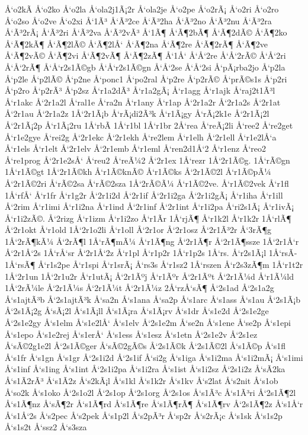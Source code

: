 {Å‘o2kÃ­
Å‘o2ko
Å‘o2la
Å‘ola2j1Ã¡2r
Å‘ola2je
Å‘o2pe
Å‘o2rÃ¡
Å‘o2ri
Å‘o2ro
Å‘o2so
Å‘o2ve
Å‘o2xi
Å‘1Ã³
Å‘Ã³2ce
Å‘Ã³2ha
Å‘Ã³2no
Å‘Ã³2nu
Å‘Ã³2ra
Å‘Ã³2rÃ¡
Å‘Ã³2ri
Å‘Ã³2va
Å‘Ã³2vÃ³
Å‘1Ã¶
Å‘Ã¶2bÃ¶
Å‘Ã¶2dÃ©
Å‘Ã¶2ko
Å‘Ã¶2kÃ¶
Å‘Ã¶2lÃ©
Å‘Ã¶2lÅ‘
Å‘Ã¶2na
Å‘Ã¶2re
Å‘Ã¶2rÃ¶
Å‘Ã¶2ve
Å‘Ã¶2vÃ©
Å‘Ã¶2vi
Å‘Ã¶2vÃ¶
Å‘Ã¶2zÃ¶
Å‘1Å‘
Å‘Å‘2re
Å‘Å‘2rÃ©
Å‘Å‘2ri
Å‘Å‘2rÃ¶
Å‘Å‘r2s1Ã©gb
Å‘Å‘r2s1Ã©gn
Å‘Å‘2se
Å‘Å‘2si
Å‘pÃ¡rba2jo
Å‘p2la
Å‘p2le
Å‘p2lÃ©
Å‘p2ne
Å‘ponc1
Å‘po2ral
Å‘p2re
Å‘p2rÃ©
Å‘prÃ©s1s
Å‘p2ri
Å‘p2ro
Å‘p2rÃ³
Å‘p2sz
Å‘r1a2dÃ³
Å‘r1a2gÃ¡
Å‘r1agg
Å‘r1ajk
Å‘raj2t1Ã³l
Å‘r1akc
Å‘2r1a2l
Å‘ral1e
Å‘ra2n
Å‘r1any
Å‘r1ap
Å‘2r1a2r
Å‘2r1a2s
Å‘2r1at
Å‘2r1au
Å‘2r1a2z
1Å‘2r1Ã¡b
Å‘rÃ¡di2Ã³k
Å‘r1Ã¡gy
Å‘rÃ¡2k1e
Å‘2r1Ã¡2l
Å‘2r1Ã¡2p
Å‘r1Ã¡2ru
1Å‘rbÃ­
1Å‘r1bl
1Å‘r1br
2Å‘rea
Å‘reÃ¡2li
Å‘ree2
Å‘re2get
Å‘r1e2gye
Å‘rei2g
Å‘2r1ekc
Å‘2r1ekh
Å‘re2lem
Å‘r1elh
Å‘2r1ell
Å‘r1e2lÅ‘a
Å‘r1els
Å‘r1elt
Å‘2r1elv
Å‘2r1emb
Å‘r1eml
Å‘ren2d1Å‘2
Å‘r1enz
Å‘reo2
Å‘re1prog
Å‘2r1e2sÅ‘
Å‘reu2
Å‘reÃ¼2
Å‘2r1ex
1Å‘rezr
1Å‘2r1Ã©g.
1Å‘rÃ©gn
1Å‘r1Ã©gt
1Å‘2r1Ã©kh
Å‘r1Ã©knÃ©
Å‘r1Ã©ks
Å‘2r1Ã©2l
Å‘r1Ã©pÃ¼
Å‘2r1Ã©2ri
Å‘rÃ©2sa
Å‘rÃ©2sza
1Å‘2rÃ©Ã¼
Å‘r1Ã©2ve.
Å‘r1Ã©2vek
Å‘r1fl
1Å‘rfÅ‘
Å‘r1fr
Å‘r1g2r
Å‘2r1i2d
Å‘2r1if
Å‘2r1i2ga
Å‘2r1i2gÃ¡
Å‘r1iha
Å‘r1ill
Å‘2rim
Å‘r1imi
Å‘r1i2na
Å‘r1ind
Å‘2r1inf
Å‘2r1int
Å‘r1i2pa
Å‘ri2s1Ã¡
Å‘r1ivÃ¡
Å‘r1i2zÃ©.
Å‘2rizg
Å‘r1izm
Å‘r1i2zo
Å‘r1Ã­r
1Å‘rjÃ¶
Å‘r1k2l
Å‘r1k2r
1Å‘rlÃ¶
Å‘2r1okt
Å‘r1old
1Å‘2r1o2li
Å‘r1oll
Å‘2r1or
Å‘2r1osz
Å‘2r1Ã³2r
Å‘3rÃ¶g
1Å‘2rÃ¶kÃ¼
Å‘2rÃ¶l
1Å‘rÃ¶mÃ¼
Å‘r1Ã¶ng
Å‘2r1Ã¶r
Å‘2r1Ã¶ssze
1Å‘2r1Å‘r
Å‘2r1Å‘2s
1Å‘rÅ‘sr
Å‘2r1Å‘2z
Å‘r1pl
Å‘r1p2r
1Å‘r1p2s
1Å‘rs.
Å‘r2s1Ã¡l
1Å‘rsÃ­
1Å‘rsÃ¶
Å‘r1s2pe
Å‘r1spi
Å‘r1srÃ¡
Å‘rs3s
Å‘r1sz2
1Å‘rszen
Å‘r2s3zÃ¶m
1Å‘r1t2r
1Å‘2r1un
1Å‘2r1u2r
Å‘r1utÃ¡
Å‘2r1Ãºj
Å‘r1Ãºr
Å‘2r1Ãºt
Å‘2r1Ã¼d
Å‘r1Ã¼ld
1Å‘2rÃ¼le
Å‘2r1Ã¼s
Å‘2r1Ã¼t
Å‘2r1Ã¼z
2Å‘rzÅ‘sÃ¶
Å‘2s1ad
Å‘2s1a2g
Å‘s1ajtÃ³b
Å‘2s1ajtÃ³k
Å‘sa2n
Å‘s1ana
Å‘sa2p
Å‘s1arc
Å‘s1ass
Å‘s1au
Å‘2s1Ã¡b
Å‘2s1Ã¡2g
Å‘sÃ¡2l
Å‘s1Ã¡ll
Å‘s1Ã¡ra
Å‘s1Ã¡rv
Å‘s1dr
Å‘s1e2d
Å‘2s1e2ge
Å‘2s1e2gy
Å‘s1elm
Å‘s1e2lÅ‘
Å‘s1elv
Å‘2s1e2m
Å‘se2n
Å‘s1ene
Å‘se2p
Å‘s1epi
Å‘s1epo
Å‘s1e2rej
Å‘s1erÅ‘
Å‘s1ess
Å‘s1esz
Å‘s1etn
Å‘2s1e2v
Å‘2s1ez
Å‘sÃ©2g1e2l
Å‘2s1Ã©ger
Å‘sÃ©2gÃ©s
Å‘2s1Ã©k
Å‘2s1Ã©2l
Å‘s1Ã©p
Å‘s1fl
Å‘s1fr
Å‘s1gn
Å‘s1gr
Å‘2s1i2d
Å‘2s1if
Å‘si2g
Å‘s1iga
Å‘s1i2ma
Å‘s1i2mÃ¡
Å‘s1imi
Å‘s1inf
Å‘s1ing
Å‘s1int
Å‘2s1i2pa
Å‘s1i2ra
Å‘s1ist
Å‘s1i2sz
Å‘2s1i2z
Å‘sÃ­2ka
Å‘s1Ã­2rÃ³
Å‘s1Ã­2z
Å‘s2kÃ¡l
Å‘s1kl
Å‘s1k2r
Å‘s1kv
Å‘s2lat
Å‘s2nit
Å‘s1ob
Å‘so2k
Å‘s1oko
Å‘2s1o2l
Å‘2s1op
Å‘2s1org
Å‘2s1os
Å‘s1Ã³c
Å‘s1Ã³ri
Å‘2s1Ã¶2l
Å‘s1Ã¶nz
Å‘sÃ¶2r
Å‘s1Ã¶rd
Å‘s1Ã¶re
Å‘s1Ã¶rÃ¶
Å‘s1Ã¶rv
Å‘2s1Ã¶2z
Å‘s1Å‘r
Å‘s1Å‘2s
Å‘s2pec
Å‘s2pek
Å‘s1p2l
Å‘s2pÃ³r
Å‘sp2r
Å‘s2rÃ¡c
Å‘s1sk
Å‘s1s2p
Å‘s1s2t
Å‘ssz2
Å‘s3sza
}

